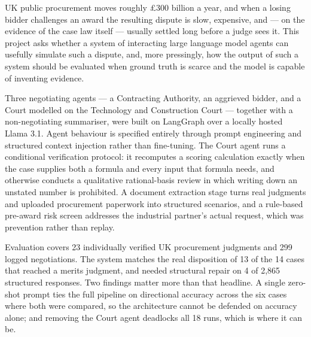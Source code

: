 \abstracttitle
{\singlespacing
UK public procurement moves roughly \pounds300 billion a year, and when a losing
bidder challenges an award the resulting dispute is slow, expensive, and --- on the
evidence of the case law itself --- usually settled long before a judge sees it.
This project asks whether a system of interacting large language model agents can
usefully simulate such a dispute, and, more pressingly, how the output of such a
system should be evaluated when ground truth is scarce and the model is capable of
inventing evidence.

Three negotiating agents --- a Contracting Authority, an aggrieved bidder, and a
Court modelled on the Technology and Construction Court --- together with a
non-negotiating summariser, were built on LangGraph over a locally hosted Llama
3.1. Agent behaviour is specified entirely through prompt engineering and
structured context injection rather than fine-tuning. The Court agent runs a
conditional verification protocol: it recomputes a scoring calculation exactly
when the case supplies both a formula and every input that formula needs, and
otherwise conducts a qualitative rational-basis review in which writing down an
unstated number is prohibited. A document extraction stage turns real judgments
and uploaded procurement paperwork into structured scenarios, and a rule-based
pre-award risk screen addresses the industrial partner's actual request, which was
prevention rather than replay.

Evaluation covers 23 individually verified UK procurement judgments and 299 logged
negotiations. The system matches the real disposition of 13 of the 14 cases that
reached a merits judgment, and needed structural repair on 4 of 2,865 structured
responses. Two findings matter more than that headline. A single zero-shot prompt
ties the full pipeline on directional accuracy across the six cases where both were
compared, so the architecture cannot be defended on accuracy alone; and removing
the Court agent deadlocks all 18 runs, which is where it can be.
}
